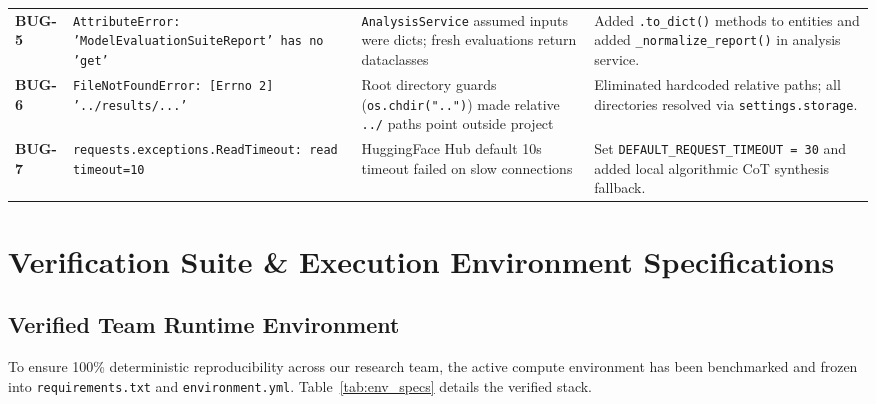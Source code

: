 \documentclass[12pt, a4paper]{article}
\begin{document}
\begin{table}[H]
\begin{tabularx}{\textwidth}{l p{3.8cm} p{4.2cm} X}
\addlinespace[3pt]
\textbf{BUG-5} & \texttt{AttributeError: 'ModelEvaluationSuiteReport' has no 'get'} & \texttt{AnalysisService} assumed inputs were dicts; fresh evaluations return dataclasses & Added \texttt{.to\_dict()} methods to entities and added \texttt{\_normalize\_report()} in analysis service. \\
\addlinespace[3pt]
\textbf{BUG-6} & \texttt{FileNotFoundError: [Errno 2] '../results/...'} & Root directory guards (\texttt{os.chdir("..")}) made relative \texttt{../} paths point outside project & Eliminated hardcoded relative paths; all directories resolved via \texttt{settings.storage}. \\
\addlinespace[3pt]
\textbf{BUG-7} & \texttt{requests.exceptions.ReadTimeout: read timeout=10} & HuggingFace Hub default 10s timeout failed on slow connections & Set \texttt{DEFAULT\_REQUEST\_TIMEOUT = 30} and added local algorithmic CoT synthesis fallback. \\
\bottomrule
\end{tabularx}
\end{table}

\section{Verification Suite \& Execution Environment Specifications}

\subsection{Verified Team Runtime Environment}
To ensure 100\% deterministic reproducibility across our research team, the active compute environment has been benchmarked and frozen into \texttt{requirements.txt} and \texttt{environment.yml}. Table~\ref{tab:env_specs} details the verified stack.
\end{document}
